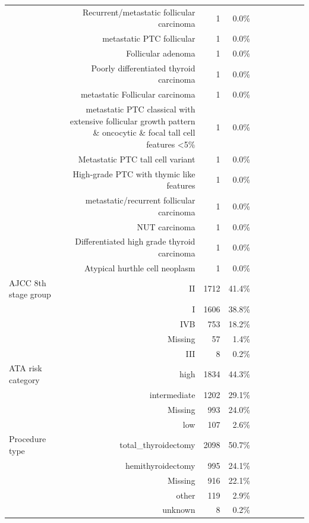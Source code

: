 \begin{table}[htbp]
\begin{tabular}{lrrrrrrrrr}
 & Recurrent/metastatic follicular carcinoma & 1 & 0.0\% &  &  &  &  &  &  \\
 &  metastatic PTC follicular & 1 & 0.0\% &  &  &  &  &  &  \\
 & Follicular adenoma & 1 & 0.0\% &  &  &  &  &  &  \\
 &  Poorly differentiated thyroid carcinoma & 1 & 0.0\% &  &  &  &  &  &  \\
 & metastatic Follicular carcinoma & 1 & 0.0\% &  &  &  &  &  &  \\
 & metastatic PTC classical with extensive follicular growth pattern \& oncocytic \& focal tall cell features <5\% & 1 & 0.0\% &  &  &  &  &  &  \\
 & Metastatic PTC tall cell variant & 1 & 0.0\% &  &  &  &  &  &  \\
 & High-grade PTC with thymic like features & 1 & 0.0\% &  &  &  &  &  &  \\
 & metastatic/recurrent follicular carcinoma & 1 & 0.0\% &  &  &  &  &  &  \\
 & NUT carcinoma & 1 & 0.0\% &  &  &  &  &  &  \\
 & Differentiated high grade thyroid carcinoma  & 1 & 0.0\% &  &  &  &  &  &  \\
 & Atypical hurthle cell neoplasm & 1 & 0.0\% &  &  &  &  &  &  \\
AJCC 8th stage group & II & 1712 & 41.4\% &  &  &  &  &  &  \\
 & I & 1606 & 38.8\% &  &  &  &  &  &  \\
 & IVB & 753 & 18.2\% &  &  &  &  &  &  \\
 & Missing & 57 & 1.4\% &  &  &  &  &  &  \\
 & III & 8 & 0.2\% &  &  &  &  &  &  \\
ATA risk category & high & 1834 & 44.3\% &  &  &  &  &  &  \\
 & intermediate & 1202 & 29.1\% &  &  &  &  &  &  \\
 & Missing & 993 & 24.0\% &  &  &  &  &  &  \\
 & low & 107 & 2.6\% &  &  &  &  &  &  \\
Procedure type & total\_thyroidectomy & 2098 & 50.7\% &  &  &  &  &  &  \\
 & hemithyroidectomy & 995 & 24.1\% &  &  &  &  &  &  \\
 & Missing & 916 & 22.1\% &  &  &  &  &  &  \\
 & other & 119 & 2.9\% &  &  &  &  &  &  \\
 & unknown & 8 & 0.2\% &  &  &  &  &  &  \\

\end{tabular}
\end{table}

